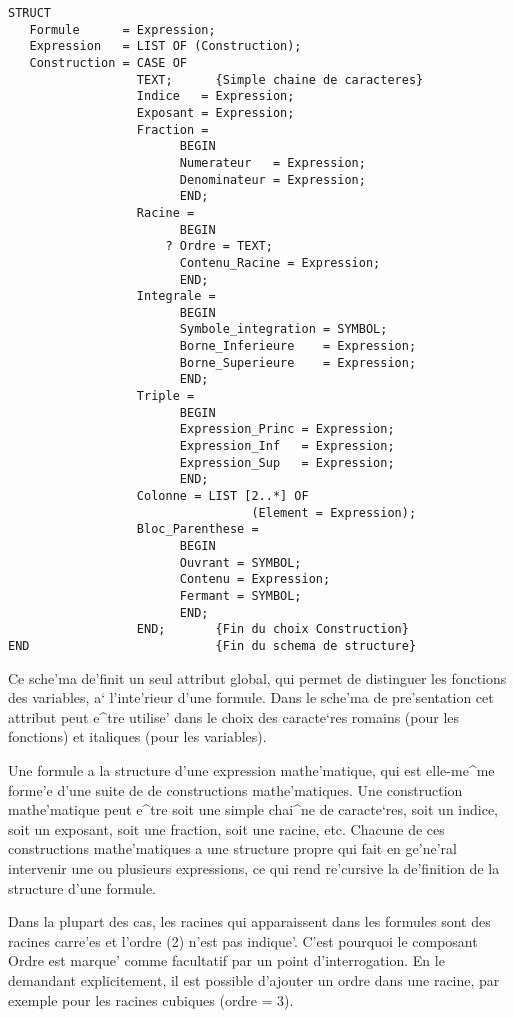 {\begin{verbatim}
STRUCT
   Formule      = Expression;
   Expression   = LIST OF (Construction);
   Construction = CASE OF
                  TEXT;      {Simple chaine de caracteres}
                  Indice   = Expression;
                  Exposant = Expression;
                  Fraction =
                        BEGIN
                        Numerateur   = Expression;
                        Denominateur = Expression;
                        END;
                  Racine = 
                        BEGIN
                      ? Ordre = TEXT;
                        Contenu_Racine = Expression;
                        END;
                  Integrale =
                        BEGIN
                        Symbole_integration = SYMBOL;
                        Borne_Inferieure    = Expression;
                        Borne_Superieure    = Expression;
                        END;
                  Triple =
                        BEGIN
                        Expression_Princ = Expression;
                        Expression_Inf   = Expression;
                        Expression_Sup   = Expression;
                        END;
                  Colonne = LIST [2..*] OF
                                  (Element = Expression);
                  Bloc_Parenthese =
                        BEGIN
                        Ouvrant = SYMBOL;
                        Contenu = Expression;
                        Fermant = SYMBOL;
                        END;
                  END;       {Fin du choix Construction}
END                          {Fin du schema de structure}
\end{verbatim}

Ce sche'ma de'finit un seul attribut global, qui permet de distinguer les
fonctions des variables, a` l'inte'rieur d'une formule. Dans le sche'ma de
pre'sentation cet attribut peut e^tre utilise' dans le choix des caracte`res
romains (pour les fonctions) et italiques (pour les variables).

Une formule a la structure d'une expression mathe'matique, qui est elle-me^me
forme'e d'une suite de de constructions mathe'matiques. Une construction
mathe'matique peut e^tre soit une simple chai^ne de caracte`res, soit un
indice, soit un exposant, soit une fraction, soit une racine, etc.
Chacune de ces constructions mathe'matiques a une structure propre qui fait
en ge'ne'ral intervenir une ou plusieurs expressions, ce qui rend re'cursive
la de'finition de la structure d'une formule.

Dans la plupart des cas, les racines qui apparaissent dans les formules sont
des racines carre'es et l'ordre (2) n'est pas indique'. C'est pourquoi le
composant Ordre est marque' comme facultatif par un point
d'interrogation. En le demandant explicitement, il est possible d'ajouter
un ordre dans une racine, par exemple pour les racines cubiques (ordre = 3).

}
